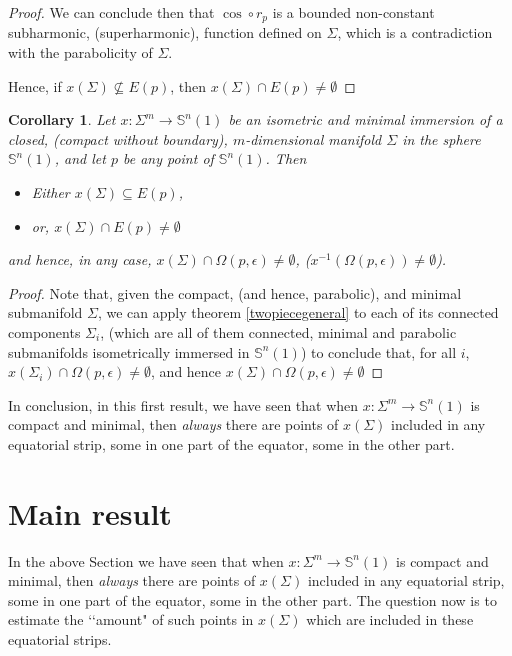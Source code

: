 \documentclass{amsart}
\newtheorem{corollary}[theorem]{Corollary}
\theoremstyle{definition}
\theoremstyle{remark}
\begin{document}
\begin{proof}
We can conclude then that $\cos\circ r_p$ is a bounded non-constant subharmonic, (superharmonic), function defined on $\Sigma$, which is a contradiction with the parabolicity of $\Sigma$.

 Hence, if  $x(\Sigma) \not\subseteq E(p)$, then $x(\Sigma)\cap  E(p)\neq \emptyset$

\end{proof}

\begin{corollary}
	Let  $x: \Sigma^m \to \mathbb{S}^n(1)$ be an isometric and minimal immersion of a closed, (compact without boundary), $m$-dimensional manifold $\Sigma$ in the sphere  $\mathbb{S}^n(1)$, and let $p$ be any point of $\mathbb{S}^n(1)$.  Then
    \begin{itemize}
        \item Either $x(\Sigma)\subseteq E(p)$, 
        \item or, $x(\Sigma)\cap E(p)\neq \emptyset$
            \end{itemize}
            and  hence, in any case,  $x(\Sigma) \cap \Omega(p,\epsilon) \neq \emptyset$, ($x^{-1}(\Omega(p,\epsilon))\neq \emptyset$).
\end{corollary}
\begin{proof}
Note that, given the compact, (and hence, parabolic), and minimal submanifold $\Sigma$, we can apply  theorem \ref{twopiecegeneral} to each of its connected components $\Sigma_i$, (which are all of them connected, minimal and parabolic submanifolds isometrically immersed in  $\mathbb{S}^n(1)$)  to conclude that, for all $i$, $x(\Sigma_i) \cap \Omega(p,\epsilon) \neq \emptyset$, and hence $x(\Sigma) \cap \Omega(p,\epsilon) \neq \emptyset$

\end{proof}

In conclusion, in this first result, we have seen that when $x: \Sigma^m \to \mathbb{S}^n(1)$ is  compact and minimal, then \emph{always} there are points of $x(\Sigma)$ included in any equatorial strip, some in one part of the equator, some in the other part.



\section{Main result}

In the above Section we have seen that when $x: \Sigma^m \to \mathbb{S}^n(1)$ is  compact and minimal, then \emph{always} there are points of $x(\Sigma)$ included in any equatorial strip, some in one part of the equator, some in the other part. The question now is to estimate the \lq\lq amount" of such points in $x(\Sigma)$ which are included in these equatorial strips. 
\end{document}
